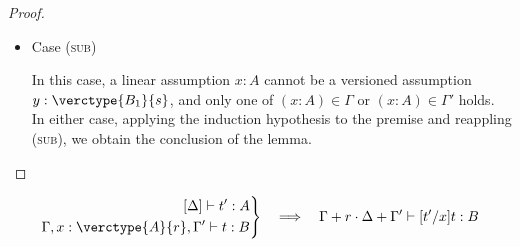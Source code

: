 \begin{proof}
\begin{itemize}
\item Case (\textsc{sub})
\begin{center}
    \begin{minipage}{.50\linewidth}
    \end{minipage}
\end{center}
In this case, a linear assumption $x:A$ cannot be a versioned assumption $y:\verctype{B_1}{s}$, and only one of $(x:A)\in\Gamma$ or $(x:A)\in\Gamma'$ holds.
In either case, applying the induction hypothesis to the premise and reappling (\textsc{sub}), we obtain the conclusion of the lemma.

\end{itemize}
\end{proof}



\begin{lemma}
\label{lemma:substitution2}
\begin{align*}
    \left.
    \begin{aligned}\relax
          [\Delta] \vdash t':A\\
          \Gamma,x:\verctype{A}{r},\Gamma' \vdash t:B
    \end{aligned}
    \right\}
    \hspace{1em}\Longrightarrow\hspace{1em}
    \Gamma + r\cdot\Delta + \Gamma' \vdash [t'/x]t:B
\end{align*}
\end{lemma}

